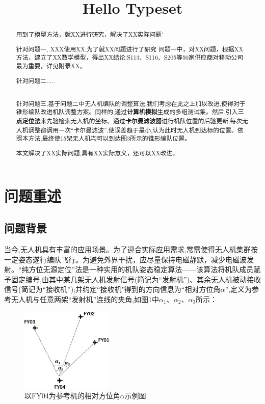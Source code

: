 \documentclass[withoutpreface,bwprint]{cumcmthesis}
\title{Hello Typeset}
\begin{document}
	\maketitle
	\begin{abstract}
		用到了模型方法，就XX进行研究，解决了XX实际问题`
		
		针对问题一, XXX使用XX,为了就XX问题进行了研究 问题一中，对XX问题，根据XX方法，建立了XX数学模型，得出XX结论:S113、S116、S205等50家供应商对移动公司最为重要，详见附录XX。
		
		针对问题二.....
		
		\\
		
		针对问题三,基于问题二中无人机编队的调整算法,我们考虑在此之上加以改进,使得对于锥形编队改进机队调整方案。同样的,通过\textbf{计算机模拟}生成的多组测试集。然后,引入\textbf{三点定位法}来先验检索无人机的坐标。通过\textbf{卡尔曼滤波器}进行机队位置的后验更新,每次无人机调整都调用一次“卡尔曼滤波”,使误差趋于最小,认为此时无人机到达标的位置。依照本方法,最终使15架无人机均可以到达图3所示的锥形编队位置。
		
		本文解决了XX实际问题,具有XX实际意义，还可以XX改进。
		
	\end{abstract}
		\section{问题重述}
	\subsection{问题背景}
	
	
	当今,无人机具有丰富的应用场景。为了迎合实际应用需求,常需使得无人机集群按一定姿态遂行编队飞行。为避免外界干扰，应尽量保持电磁静默，减少电磁波发射。“纯方位无源定位”法是一种实用的机队姿态稳定算法——该算法将机队成员赋予固定编号,由其中某几架无人机发射信号(简记为“发射机”)、其余无人机被动接收信号(简记为“接收机”);并约定“接收机"得到的方向信息为“相对方位角$\alpha$”,定义为参考无人机与任意两架“发射机”连线的夹角,如图1中$\alpha_{1}$、$\alpha_{2}$、$\alpha_{3}$所示：
	
	\begin{figure}[htbp!]
		\centering
		\includegraphics[height=4cm]{./figures/1-1.png}
		\caption{以FY04为参考机的相对方位角$\alpha$示例图}
		\label{fig:1}
	\end{figure}
	
\end{document}
